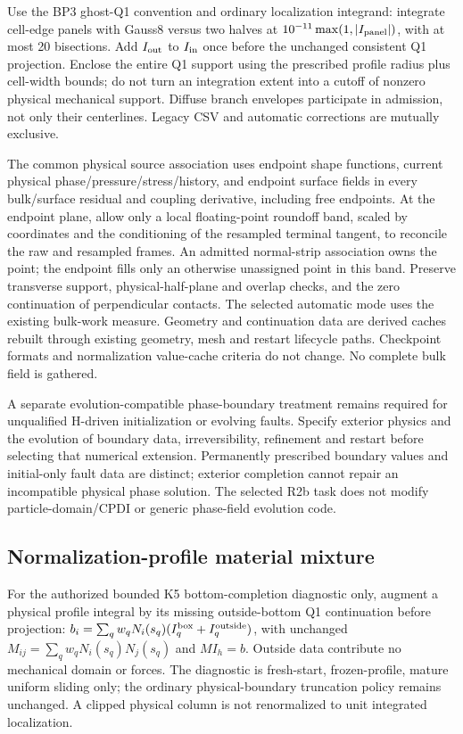 \documentclass[11pt]{article}
\begin{document}
Use the BP3 ghost-Q1 convention and ordinary localization integrand: integrate
cell-edge panels with Gauss8 versus two halves at
$10^{-11}\max(1,|I_{\rm panel}|)$, with at most 20 bisections. Add
$I_{\rm out}$ to $I_{\rm in}$ once before the unchanged consistent Q1
projection. Enclose the entire Q1 support using the prescribed profile radius
plus cell-width bounds; do not turn an integration extent into a cutoff of
nonzero physical mechanical support. Diffuse branch envelopes participate in
admission, not only their centerlines. Legacy CSV and automatic corrections
are mutually exclusive.

The common physical source association uses endpoint shape functions, current
physical phase/pressure/stress/history, and endpoint surface fields in every
bulk/surface residual and coupling derivative, including free endpoints.
At the endpoint plane, allow only a local floating-point roundoff band,
scaled by coordinates and the conditioning of the resampled terminal tangent,
to reconcile the raw and resampled frames. An admitted normal-strip association
owns the point; the endpoint fills only an otherwise unassigned point in this
band. Preserve transverse support, physical-half-plane and overlap checks,
and the zero continuation of perpendicular contacts.
The selected automatic mode uses the existing bulk-work measure. Geometry and
continuation data are derived caches rebuilt through existing geometry, mesh
and restart lifecycle paths. Checkpoint formats and normalization value-cache
criteria do not change. No complete bulk field is gathered.

A separate evolution-compatible phase-boundary treatment remains required for
unqualified H-driven initialization or evolving faults. Specify exterior
physics and the evolution of boundary data, irreversibility, refinement and
restart before selecting that numerical extension. Permanently prescribed
boundary values and initial-only fault data are distinct; exterior completion
cannot repair an incompatible physical phase solution. The selected R2b task
does not modify particle-domain/CPDI or generic phase-field evolution code.

\subsection{Normalization-profile material mixture}
For the authorized bounded K5 bottom-completion diagnostic only, augment a
physical profile integral by its missing outside-bottom Q1 continuation before
projection: $b_i=\sum_q w_q N_i(s_q)(I_q^{\rm box}+I_q^{\rm outside})$,
with unchanged $M_{ij}=\sum_q w_q N_i(s_q)N_j(s_q)$ and $M I_h=b$.
Outside data contribute no mechanical domain or forces. The diagnostic is
fresh-start, frozen-profile, mature uniform sliding only; the ordinary
physical-boundary truncation policy remains unchanged. A clipped physical
column is not renormalized to unit integrated localization.
\end{document}
